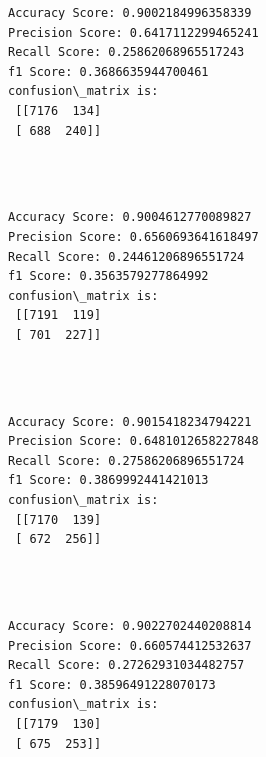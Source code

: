 \documentclass[11pt]{article}
\begin{document}
  

    \begin{Verbatim}[commandchars=\\\{\}]
Accuracy Score: 0.9002184996358339
Precision Score: 0.6417112299465241
Recall Score: 0.25862068965517243
f1 Score: 0.3686635944700461
confusion\_matrix is: 
 [[7176  134]
 [ 688  240]] 


    \end{Verbatim}

    \begin{center}
    \end{center}
    { \hspace*{\fill} \\}
    
   

    \begin{Verbatim}[commandchars=\\\{\}]
Accuracy Score: 0.9004612770089827
Precision Score: 0.6560693641618497
Recall Score: 0.24461206896551724
f1 Score: 0.3563579277864992
confusion\_matrix is: 
 [[7191  119]
 [ 701  227]] 


    \end{Verbatim}

    \begin{center}
    \end{center}
    { \hspace*{\fill} \\}
    
  

    \begin{Verbatim}[commandchars=\\\{\}]
Accuracy Score: 0.9015418234794221
Precision Score: 0.6481012658227848
Recall Score: 0.27586206896551724
f1 Score: 0.3869992441421013
confusion\_matrix is: 
 [[7170  139]
 [ 672  256]] 


    \end{Verbatim}

    \begin{center}
    \end{center}
    { \hspace*{\fill} \\}
    
    

    \begin{Verbatim}[commandchars=\\\{\}]
Accuracy Score: 0.9022702440208814
Precision Score: 0.660574412532637
Recall Score: 0.27262931034482757
f1 Score: 0.38596491228070173
confusion\_matrix is: 
 [[7179  130]
 [ 675  253]] 


    \end{Verbatim}
\end{document}
